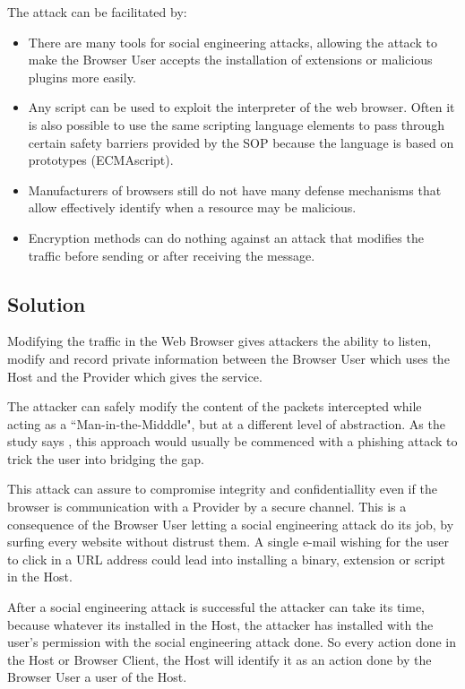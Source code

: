 \documentclass{sig-alternate-05-2015}
\begin{document}
The attack can be facilitated by:
\begin{itemize}
  \item There are many tools for social engineering attacks, allowing the attack to make the Browser User accepts the installation of extensions or malicious plugins more easily.
  \item Any script can be used to exploit the interpreter of the web browser. Often it is also possible to use the same scripting language elements to pass through certain safety barriers provided by the SOP because the language is based on prototypes (ECMAscript).
  \item Manufacturers of browsers still do not have many defense mechanisms that allow effectively identify when a resource may be malicious.
  \item Encryption methods can do nothing against an attack that modifies the traffic before sending or after receiving the message.
\end{itemize}
\subsection*{Solution}
Modifying the traffic in the Web Browser gives attackers the ability to listen, modify and record private information between the Browser User which uses the Host and the Provider which gives the service.

The attacker can safely modify the content of the packets intercepted while acting as a ``Man-in-the-Midddle", but at a different level of abstraction. As the study says \cite{Dougan2012}, this approach would usually be commenced with a phishing attack to trick the user into bridging the gap.

This attack can assure to compromise integrity and confidentiallity even if the browser is communication with a Provider by a secure channel. This is a consequence of the Browser User letting a social engineering attack do its job, by surfing every website without distrust them. A single e-mail wishing for the user to click in a URL address could lead into installing a binary, extension or script in the Host.

After a social engineering attack is successful the attacker can take its time, because whatever its installed in the Host, the attacker has installed with the user's permission with the social engineering attack done. So every action done in the Host or Browser Client, the Host will identify it as an action done by the Browser User a user of the Host.
\end{document}
